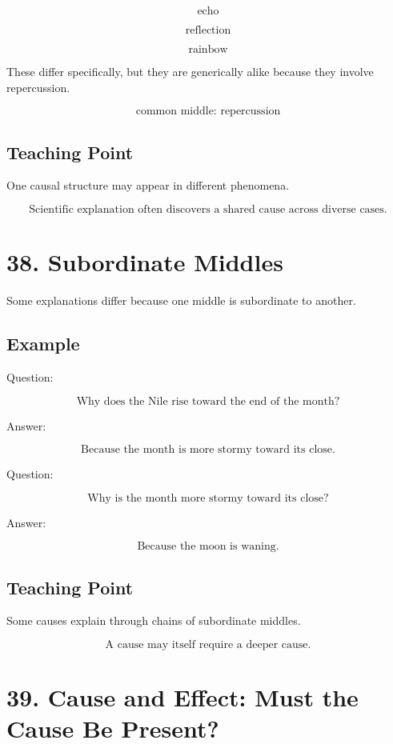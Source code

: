 \documentclass[12pt]{article}
\begin{document}
\[
\text{echo}
\]

\[
\text{reflection}
\]

\[
\text{rainbow}
\]

These differ specifically, but they are generically alike because they involve
repercussion.

\[
\boxed{
\text{common middle: repercussion}
}
\]

\subsection*{Teaching Point}

One causal structure may appear in different phenomena.

\[
\boxed{
\text{Scientific explanation often discovers a shared cause across diverse cases.}
}
\]

\section*{38. Subordinate Middles}

Some explanations differ because one middle is subordinate to another.

\subsection*{Example}

Question:

\[
\text{Why does the Nile rise toward the end of the month?}
\]

Answer:

\[
\text{Because the month is more stormy toward its close.}
\]

Question:

\[
\text{Why is the month more stormy toward its close?}
\]

Answer:

\[
\text{Because the moon is waning.}
\]

\subsection*{Teaching Point}

Some causes explain through chains of subordinate middles.

\[
\boxed{
\text{A cause may itself require a deeper cause.}
}
\]

\section*{39. Cause and Effect: Must the Cause Be Present?}
\end{document}
